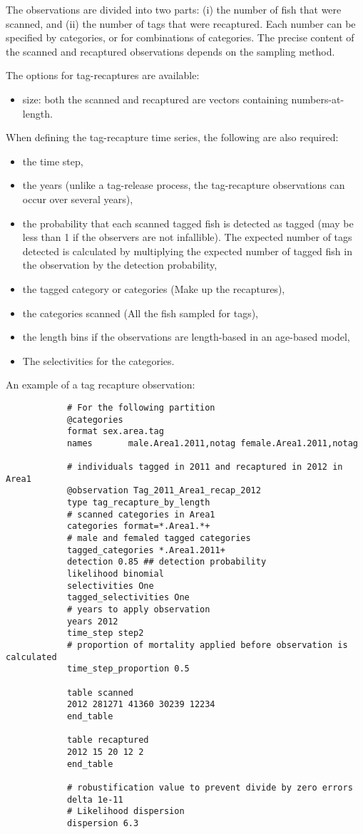 The observations are divided into two parts: (i) the number of fish that were scanned, and (ii) the number of tags that were recaptured. Each number can be specified by categories, or for combinations of categories. The precise content of the scanned and recaptured observations depends on the sampling method.

The options for tag-recaptures are available:

\begin{itemize}
	\item size: both the scanned and recaptured are vectors containing numbers-at-length. 
\end{itemize}

When defining the tag-recapture time series, the following are also required:

\begin{itemize}
	\item the time step,
	\item the years (unlike a tag-release process, the tag-recapture observations can occur over several years),
	\item the probability that each scanned tagged fish is detected as tagged (may be less than 1 if the observers are not infallible). The expected number of tags detected is calculated by multiplying the expected number of tagged fish in the observation by the detection probability,
	\item the tagged category or categories (Make up the recaptures),
	\item the categories scanned (All the fish sampled for tags),
	\item the length bins if the observations are length-based in an age-based model,
	\item The selectivities for the categories. 
\end{itemize}

An example of a tag recapture observation:

{\small{\begin{verbatim}
			# For the following partition
			@categories
			format sex.area.tag
			names  		male.Area1.2011,notag female.Area1.2011,notag
			
			# individuals tagged in 2011 and recaptured in 2012 in Area1
			@observation Tag_2011_Area1_recap_2012
			type tag_recapture_by_length
			# scanned categories in Area1
			categories format=*.Area1.*+
			# male and femaled tagged categories
			tagged_categories *.Area1.2011+
			detection 0.85 ## detection probability
			likelihood binomial
			selectivities One
			tagged_selectivities One
			# years to apply observation
			years 2012
			time_step step2
			# proportion of mortality applied before observation is calculated
			time_step_proportion 0.5
			
			table scanned
			2012 281271 41360 30239 12234
			end_table
			
			table recaptured
			2012 15 20 12 2
			end_table
			
			# robustification value to prevent divide by zero errors
			delta 1e-11
			# Likelihood dispersion
			dispersion 6.3
\end{verbatim}}}

